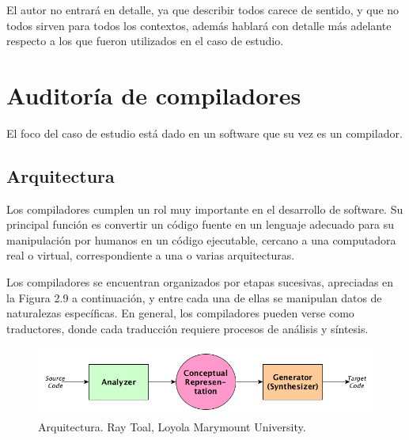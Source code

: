 El autor no entrará en detalle, ya que describir todos carece de sentido, y que no todos sirven para todos los contextos, además hablará con detalle más adelante respecto a los que fueron utilizados en el caso de estudio.

\section{Auditoría de compiladores}
El foco del caso de estudio está dado en un software que su vez es un compilador.

\subsection{Arquitectura}
Los compiladores cumplen un rol muy importante en el desarrollo de software. Su principal función es convertir un código fuente en un lenguaje adecuado para su manipulación por humanos en un código ejecutable, cercano a una computadora real o virtual, correspondiente a una o varias arquitecturas. 

Los compiladores se encuentran organizados por etapas sucesivas, apreciadas en la Figura 2.9 a continuación, y entre cada una de ellas se manipulan datos de naturalezas específicas. En general, los compiladores pueden verse como traductores, donde cada traducción requiere procesos de análisis y síntesis.

\begin{figure}[h]
    \centering
    \includegraphics[scale=0.5]{images/analsyn.png}
    \caption{Arquitectura. Ray Toal, Loyola Marymount University.}
    \label{fig:compiler architecture}
\end{figure}


